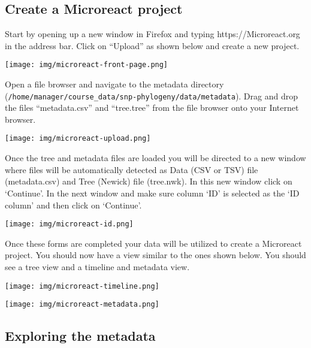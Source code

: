 \documentclass[11pt]{article}
\begin{document}
    \hypertarget{create-a-microreact-project}{%
\subsection{Create a Microreact
project}\label{create-a-microreact-project}}

Start by opening up a new window in Firefox and typing
https://Microreact.org in the address bar. Click on ``Upload'' as shown
below and create a new project.


\begin{center}
\texttt{[image: img/microreact-front-page.png]}
\end{center}


Open a file browser and navigate to the metadata directory
(\texttt{/home/manager/course\_data/snp-phylogeny/data/metadata}). Drag
and drop the files ``metadata.csv'' and ``tree.tree'' from the file
browser onto your Internet browser.


\begin{center}
\texttt{[image: img/microreact-upload.png]}
\end{center}


Once the tree and metadata files are loaded you will be directed to a
new window where files will be automatically detected as Data (CSV or
TSV) file (metadata.csv) and Tree (Newick) file (tree.nwk). In this new
window click on `Continue'. In the next window and make sure column `ID'
is selected as the `ID column' and then click on `Continue'.


\begin{center}
\texttt{[image: img/microreact-id.png]}
\end{center}


Once these forms are completed your data will be utilized to create a
Microreact project. You should now have a view similar to the ones shown
below. You should see a tree view and a timeline and metadata view.


\begin{center}
\texttt{[image: img/microreact-timeline.png]}
\end{center}



\begin{center}
\texttt{[image: img/microreact-metadata.png]}
\end{center}


    \hypertarget{exploring-the-metadata}{%
\subsection{Exploring the metadata}\label{exploring-the-metadata}}
\end{document}
